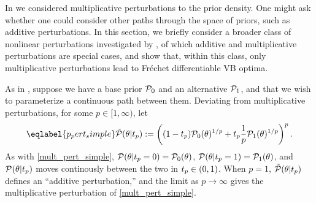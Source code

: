 In  we considered
multiplicative perturbations to the prior density.  One might ask whether one
could consider other paths through the space of priors, such as additive
perturbations.  In this section, we briefly consider a broader class of
nonlinear perturbations investigated by \citet{gustafson:1996:local}, of which
additive and multiplicative perturbations are special cases, and show that,
within this class, only multiplicative perturbations lead to Fr{\'e}chet
differentiable VB optima.

As in , suppose we have a base prior $\mathcal{P}_{0}$ and
an alternative $\mathcal{P}_{1}$, and that we wish to parameterize a continuous path
between them.  Deviating from multiplicative perturbations, for some $p \in [1,
\infty)$, let
%
\begin{align}\eqlabel{p_pert_simple}
%
\ptil(\theta \vert \tp) :=
    \left((1 - \tp)\pbase(\theta)^{1/p} +
    \tp \frac{1}{p}\palt(\theta)^{1/p} \right)^{p}.
%
\end{align}
%
As with \eqref{mult_pert_simple}, $\mathcal{P}(\theta \vert t_{p} = 0) = \mathcal{P}_{0}(\theta)$,
$\mathcal{P}(\theta \vert t_{p} = 1) = \mathcal{P}_{1}(\theta)$, and $\mathcal{P}(\theta \vert t_{p})$ moves
continously between the two in $t_{p} \in (0, 1)$.  When $p = 1$,
$\tilde{\mathcal{P}}(\theta \vert t_{p})$ defines an ``additive perturbation,'' and
the limit as $p \rightarrow \infty$ gives the multiplicative perturbation
of \eqref{mult_pert_simple}.

